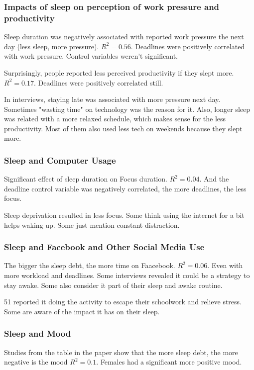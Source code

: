 \documentclass{IEEEtran}
\begin{document}
      \subsubsection{Impacts of sleep on perception of work pressure and productivity}
        Sleep duration was negatively associated with reported work pressure the next day (less sleep, more pressure). $R^2=0.56$. Deadlines were positively correlated with work pressure. Control variables weren't significant. \par 
        Surprisingly, people reported less perceived productivity if they slept more. $R^2 = 0.17$. Deadlines were positively correlated still. \par 
        In interviews, staying late was associated with more pressure next day. Sometimes "wasting time" on technology was the reason for it. Also, longer sleep was related with a more relaxed schedule, which makes sense for the less productivity. Most of them also used less tech on weekends because they slept more.
      \subsubsection{Sleep and Computer Usage}
        Significant effect of sleep duration on Focus duration. $R^2=0.04$. And the deadline control variable was negatively correlated, the more deadlines, the less focus. \par 
        Sleep deprivation resulted in less focus. Some think using the internet for a bit helps waking up. Some just mention constant distraction.
      \subsubsection{Sleep and Facebook and Other Social Media Use}
        The bigger the sleep debt, the more time on Faacebook. $R^2=0.06$. Even with more workload and deadlines. Some interviews revealed it could be a strategy to stay awake. Some also consider it part of their sleep and awake routine. \par 
        51 reported it doing the activity to escape their schoolwork and relieve stress. Some are aware of the impact it has on their sleep.
      \subsubsection{Sleep and Mood}
        Studies from the table in the paper show that the more sleep debt, the more negative is the mood $R^2=0.1$. Females had a significant more positive mood.
\end{document}
